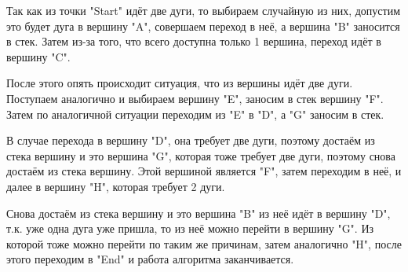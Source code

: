 Так как из точки "Start" идёт две дуги, то выбираем случайную из них, допустим это будет дуга в вершину "A", совершаем переход в неё, а вершина "B" заносится в стек. Затем из-за того, что всего доступна только 1 вершина, переход идёт в вершину "C".

После этого опять происходит ситуация, что из вершины идёт две дуги. Поступаем аналогично и выбираем вершину "E", заносим в стек вершину "F". Затем по аналогичной ситуации переходим из "E" в "D", а "G" заносим в стек.

В случае перехода в вершину "D", она требует две дуги, поэтому достаём из стека вершину и это вершина "G", которая тоже требует две дуги, поэтому снова достаём из стека вершину. Этой вершиной является "F", затем переходим в неё, и далее в вершину "H", которая требует 2 дуги.

Снова достаём из стека вершину и это вершина "B" из неё идёт в вершину "D", т.к. уже одна дуга уже пришла, то из неё можно перейти в вершину "G". Из которой тоже можно перейти по таким же причинам, затем аналогично "H", после этого переходим в "End" и работа алгоритма заканчивается.

\noteattributes{}
